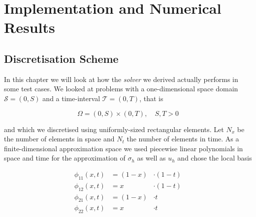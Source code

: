 \documentclass[../draft_1.tex]{subfiles}
\begin{document}
\chapter{Implementation and Numerical Results}

\section{Discretisation Scheme}
In this chapter we will look at how the \textit{solver} we derived actually performs in some test cases. We looked at problems with a one-dimensional space domain $\mathcal{S} = (0, S)$ and a time-interval $\mathcal{T} = (0,T)$, that is 
\begin{ceqn}
\begin{equation}
\Omega = (0, S) \times (0, T), \quad S,T > 0
\end{equation}
\end{ceqn}
and which we discretised using uniformly-sized rectangular elements. Let $N_x$ be the number of elements in space and $N_t$ the number of elements in time. As a finite-dimensional approximation space we used piecewise linear polynomials in space and time for the approximation of $\sigma_h$ as well as $u_h$ and chose the local basis \\

\begin{minipage}[l]{0.5\linewidth}
	
\end{minipage}%
\begin{minipage}[r]{0.5\linewidth}
\begin{ceqn}
	\begin{equation}
	\begin{aligned}
	\phi_{11}(x,t) &= (1- x) &\cdot (1-t) \\
	\phi_{12}(x,t) &=  x  &\cdot  (1-t) \\
	\phi_{21}(x,t) &= (1- x) &\cdot t  \\
	\phi_{22}(x,t) &= x  &\cdot  t 
	\end{aligned}
	\end{equation}
	\end{ceqn}
\end{minipage}
\end{document}
